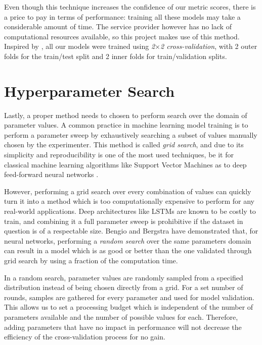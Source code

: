 \documentclass{kththesis}
\begin{document}
Even though this technique increases the confidence of our metric scores, there is a price to pay in terms of performance: training all these models may take a considerable amount of time. The service provider however has no lack of computational resources available, so this project makes use of this method. Inspired by \citep{Burez2009}, all our models were trained using \emph{2$\times$2 cross-validation}, with 2 outer folds for the train/test split and 2 inner folds for train/validation splits.

\section{Hyperparameter Search}

Lastly, a proper method needs to chosen to perform search over the domain of parameter values. A common practice in machine learning model training is to perform a parameter sweep by exhaustively searching a subset of values manually chosen by the experimenter. This method is called \emph{grid search}, and due to its simplicity and reproducibility is one of the most used techniques, be it for classical machine learning algorithms like Support Vector Machines as to deep feed-forward neural networks \citep{larochelle2007empirical}.

However, performing a grid search over every combination of values can quickly turn it into a method which is too computationally expensive to perform for any real-world applications. Deep architectures like LSTMs are known to be costly to train, and combining it a full parameter sweep is prohibitive if the dataset in question is of a respectable size. Bengio and Bergstra\citep{bergstra2012random} have demonstrated that, for neural networks, performing a \emph{random search} over the same parameters domain can result in a model which is as good or better than the one validated through grid search by using a fraction of the computation time. 

In a random search, parameter values are randomly sampled from a specified distribution instead of being chosen directly from a grid. For a set number of rounds, samples are gathered for every parameter and used for model validation. This allows us to set a processing budget which is independent of the number of parameters available and the number of possible values for each. Therefore, adding parameters that have no impact in performance will not decrease the efficiency of the cross-validation process for no gain. 
\end{document}

